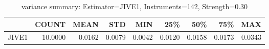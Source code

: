 \begin{table}[ht]
\centering
\caption{variance summary: Estimator=JIVE1, Instruments=142, Strength=0.30}
\begin{tabular}{lrrrrrrrr}
\toprule
 & COUNT & MEAN & STD & MIN & 25\% & 50\% & 75\% & MAX \\
\midrule
JIVE1 & 10.0000 & 0.0162 & 0.0079 & 0.0042 & 0.0120 & 0.0158 & 0.0173 & 0.0343 \\
\bottomrule
\end{tabular}
\end{table}
